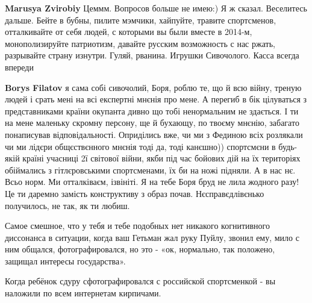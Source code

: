\begin{itemize}
\begin{itemize}
 
\textbf{Marusya Zvirobiy} Цеммм.
Вопросов больше не имею:)
Я ж сказал. Веселитесь дальше.
Бейте в бубны, пилите мэмчики, хайпуйте, травите спортсменов, отталкивайте от себя людей, с которыми вы были вместе в 2014-м, монополизируйте патриотизм, давайте русским возможность с нас ржать, разрывайте страну изнутри.
Гуляй, рванина.
Игрушки Сивочолого.
Касса всегда впереди

 

\textbf{Borys Filatov} я сама собі сивочолий, Боря, роблю те, що й всю війну,
треную людей і срать мені на всі експертні мнєнія про мене. А перегиб в бік
цілуваться з представниками країни окупанта дивно що тобі ненормальним не
здається. І ти на мене маленьку скромну персону, ще й бухающу, по твоєму
мнєнію, забагато понаписував відповідальності. Оприділись вже, чи ми з Фединою
всіх розлякали чи ми лідєри общєствєнного мнєнія тоді да, тоді канєшно))
спортсмєни в будь-якій країні учасниці 2ї світової війни, якби під час бойових
дій на їх територіях обіймались з гітлєровськими спортсменами, їх би на ножі
підняли. А в нас нє. Всьо норм. Ми отталківаєм, ізвініті. Я на тебе Боря бруд
не лила жодного разу! Це ти даремно замість конструктиву з образ почав.
Нєсправєдлівєнько получилось, не так, як ти любиш.


 

Самое смешное, что у тебя и тебе подобных нет никакого когнитивного диссонанса
в ситуации, когда ваш Гетьман жал руку Пуйлу, звонил ему, мило с ним общался,
фотографировался, но это - «ок, нормально, так положено, защищал интересы
государства».

Когда ребёнок сдуру сфотографировался с российской спортсменкой - вы наложили
по всем интернетам кирпичами.


\end{itemize}
\end{itemize}
